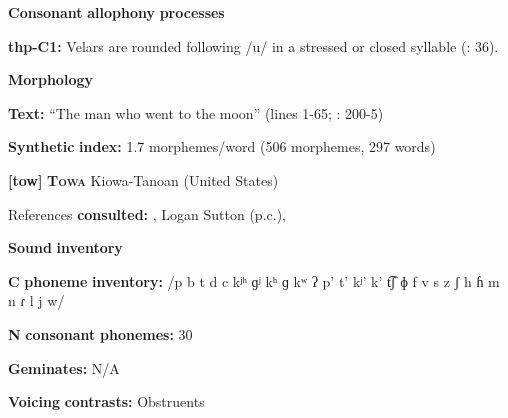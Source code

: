 \begin{styleBody}
\textbf{Consonant} \textbf{allophony} \textbf{processes}
\end{styleBody}

\begin{styleBody}
\textbf{thp-C1:} Velars are rounded following /u/ in a stressed or closed syllable (\citealt{ThompsonThompson1992}: 36).
\end{styleBody}

\begin{styleBody}
\textbf{Morphology}
\end{styleBody}

\begin{styleBody}
\textbf{Text:} “The man who went to the moon” (lines 1-65; \citealt{ThompsonThompson1992}: 200-5)
\end{styleBody}

\begin{styleBody}
\textbf{Synthetic} \textbf{index:} 1.7 morphemes/word (506 morphemes, 297 words)
\end{styleBody}

\begin{styleBody}
\textbf{[tow]}   \textbf{\textsc{Towa}  }  Kiowa-Tanoan (United States)
\end{styleBody}

\begin{styleBody}
References \textbf{consulted:} \citet{Bell1993}, Logan Sutton (p.c.), \citet{Yumitani1998}
\end{styleBody}

\begin{styleBody}
\textbf{Sound} \textbf{inventory}
\end{styleBody}

\begin{styleBody}
\textbf{C} \textbf{phoneme} \textbf{inventory:} /p b t d c kʲʰ ɡʲ kʰ ɡ kʷ ʔ p’ t’ kʲ’ k’ t͡ʃ ɸ f v s z ʃ h ɦ m n ɾ l j w/
\end{styleBody}

\begin{styleBody}
\textbf{N} \textbf{consonant} \textbf{phonemes:} 30
\end{styleBody}

\begin{styleBody}
\textbf{Geminates:} N/A
\end{styleBody}

\begin{styleBody}
\textbf{Voicing} \textbf{contrasts:} Obstruents
\end{styleBody}

